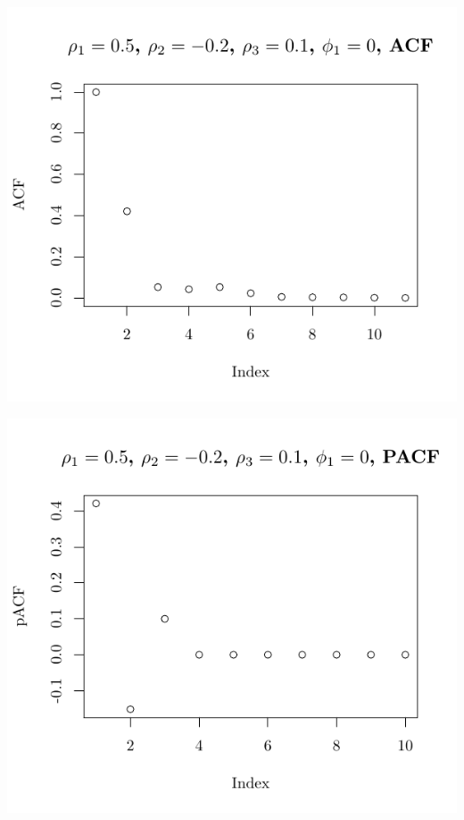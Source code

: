 \documentclass[10pt]{paper}\usepackage[]{graphicx}\usepackage[]{color}
\makeatletter
\def\maxwidth{ %
  \ifdim\Gin@nat@width>\linewidth
    \linewidth
  \else
    \Gin@nat@width
  \fi
}
\newenvironment{knitrout}{}{} %
\makeatother
\begin{document}
\begin{knitrout}
{\centering \includegraphics[width=\maxwidth]{figure/graphics-plotter-107} 

}




{\centering \includegraphics[width=\maxwidth]{figure/graphics-plotter-108} 

}





\end{knitrout}
\end{document}
